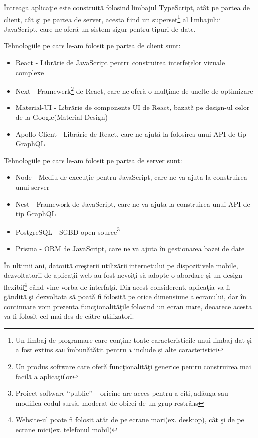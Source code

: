 \documentclass[12pt, a4paper, oneside, romanian]{teza-upb}
\begin{document}
Întreaga aplicaţie este construită folosind limbajul TypeScript, atât pe partea de client, cât şi pe partea de server, acesta fiind un superset\footnote{Un limbaj de programare care conține toate caracteristicile unui limbaj dat și a fost extins sau îmbunătățit pentru a include și alte caracteristici} al limbajului JavaScript, care ne oferă un sistem sigur pentru tipuri de date.\cite{documentatietypescript}

Tehnologiile pe care le-am folosit pe partea de client sunt:
\begin{itemize}
	\item React\cite{documentatiereact} - Librărie de JavaScript pentru construirea interfețelor vizuale complexe
	\item Next\cite{documentatienext} - Framework\footnote{Un produs software care oferă funcţionalităţi generice pentru construirea mai facilă a aplicaţiilor} de React, care ne oferă o mulţime de unelte de optimizare
	\item Material-UI\cite{documentatiematerialui} - Librărie de componente UI de React, bazată pe design-ul celor de la Google(Material Design)
	\item Apollo Client\cite{documentatieapolloclient} - Librărie de React, care ne ajută la folosirea unui API de tip GraphQL
\end{itemize}

Tehnologiile pe care le-am folosit pe partea de server sunt:
\begin{itemize}
	\item Node\cite{documentatienode} - Mediu de execuţie pentru JavaScript, care ne va ajuta la construirea unui server
	\item Nest\cite{documentatienest} - Framework de JavaScript, care ne va ajuta la construirea unui API de tip GraphQL
	\item PostgreSQL\cite{documentatiepostgresql} - SGBD open-source\footnote{Proiect software ``public'' -- oricine are acces pentru a citi, adăuga sau modifica codul sursă, moderat de obicei de un grup restrâns}
	\item Prisma\cite{documentatieprisma} - ORM de JavaScript, care ne va ajuta în gestionarea bazei de date
\end{itemize}

În ultimii ani, datorită creşterii utilizării internetului pe dispozitivele mobile, dezvoltatorii de aplicaţii web au fost nevoiţi să adopte o abordare şi un design flexibil\footnote{Website-ul poate fi folosit atât de pe ecrane mari(ex. desktop), cât şi de pe ecrane mici(ex. telefonul mobil)} când vine vorba de interfaţă. Din acest considerent, aplicaţia va fi gândită şi dezvoltata să poată fi folosită pe orice dimensiune a ecranului, dar în continuare vom prezenta funcţionalităţile folosind un ecran mare, deoarece acesta va fi folosit cel mai des de către utilizatori.\cite{designflexibil}
\end{document}
